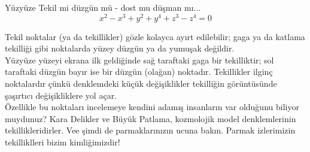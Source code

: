 \begin{surferPage}{Yüzyüze}
Tekil mi düzgün mü - dost mu düşman mı...\\
\smallskip
\[x^2	- x^3+ y^2+ y^4+ z^3- z^4	=  0\]

\vspace{0.3cm}
Tekil noktalar (ya da tekillikler) gözle kolayca ayırt edilebilir; gaga ya da katlama tekilliği gibi noktalarda yüzey düzgün ya da  yumuşak değildir. \\
\vspace{0.3cm}
Yüzyüze yüzeyi ekrana ilk geldiğinde sağ taraftaki gaga bir tekilliktir; sol taraftaki düzgün bayır ise bir düzgün (olağan) noktadır. Tekillikler ilginç noktalardır çünkü denklemdeki küçük değişiklikler tekilliğin görüntüsünde şaşırtıcı değişikliklere yol açar. \\

\vspace{0.3cm}
Özellikle bu noktaları incelemeye kendini adamış insanların var olduğunu biliyor muydunuz?
Kara Delikler ve Büyük Patlama, kozmolojik model denklemlerinin tekillikleridirler. Vee şimdi de parmaklarınızın ucuna bakın. Parmak izlerimizin tekilliklleri bizim kimliğimizdir!
\end{surferPage}
